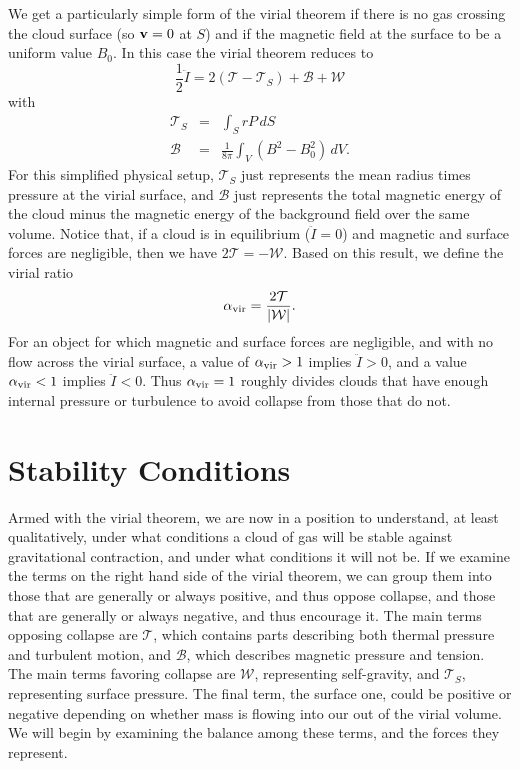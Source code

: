 We get a particularly simple form of the virial theorem if there is no gas crossing the cloud surface (so $\mathbf{v}=0$ at $S$) and if the magnetic field at the surface to be a uniform value $B_0$. In this case the virial theorem reduces to
\begin{equation}
\frac{1}{2}\ddot{I} = 2(\mathcal{T} - \mathcal{T}_S) + \mathcal{B} + \mathcal{W}
\end{equation}
with
\begin{eqnarray}
\mathcal{T}_S & = & \int_S rP \,dS\\
\mathcal{B} & = & \frac{1}{8\pi} \int_V (B^2-B_0^2) \,dV.
\end{eqnarray}
For this simplified physical setup, $\mathcal{T}_S$ just represents the mean radius times pressure at the virial surface, and $\mathcal{B}$ just represents the total magnetic energy of the cloud minus the magnetic energy of the background field over the same volume. Notice that, if a cloud is in equilibrium ($\ddot{I}=0$) and magnetic and surface forces are negligible, then we have $2\mathcal{T} = -\mathcal{W}$. Based on this result, we define the virial ratio
\begin{equation}
\label{eq:alpha_vir_th}
\alpha_{\rm vir} = \frac{2\mathcal{T}}{|\mathcal{W}|}.
\end{equation}
For an object for which magnetic and surface forces are negligible, and with no flow across the virial surface, a value of $\alpha_{\rm vir} > 1$ implies $\ddot{I} > 0$, and a value $\alpha_{\rm vir} < 1$ implies $\ddot{I}<0$. Thus $\alpha_{\rm vir} = 1$ roughly divides clouds that have enough internal pressure or turbulence to avoid collapse from those that do not.

\section{Stability Conditions}

Armed with the virial theorem, we are now in a position to understand, at least qualitatively, under what conditions a cloud of gas will be stable against gravitational contraction, and under what conditions it will not be. If we examine the terms on the right hand side of the virial theorem, we can group them into those that are generally or always positive, and thus oppose collapse, and those that are generally or always negative, and thus encourage it. The main terms opposing collapse are $\mathcal{T}$, which contains parts describing both thermal pressure and turbulent motion, and $\mathcal{B}$, which describes magnetic pressure and tension. The main terms favoring collapse are $\mathcal{W}$, representing self-gravity, and $\mathcal{T}_S$, representing surface pressure. The final term, the surface one, could be positive or negative depending on whether mass is flowing into our out of the virial volume. We will begin by examining the balance among these terms, and the forces they represent.

